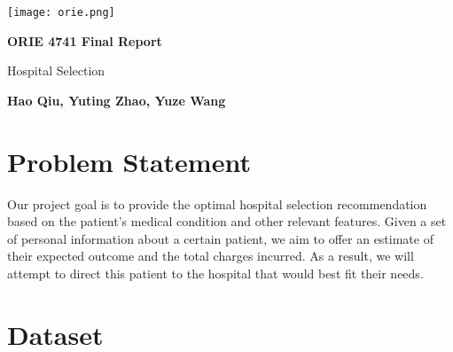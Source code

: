 \documentclass[12pt]{article}
\begin{document}
\begin{titlepage}
   \begin{center}
       
       \vspace*{1cm}
       \begin{center}
       \texttt{[image: orie.png]}
       \end{center}
       \vspace{8cm}
       
       \textbf{\Huge ORIE 4741 Final Report}
       
       \vspace{1cm}
        \larger Hospital Selection
 
       \vspace{3cm}
 
       \textbf{Hao Qiu, Yuting Zhao, Yuze Wang}
       
       \vspace{1cm}
       
 
       \vfill
       \vspace{0.8cm}
   \end{center}
\end{titlepage}

\tableofcontents
\pagebreak

\section{Problem Statement}
Our project goal is to provide the optimal hospital selection recommendation based on the patient’s medical condition and other relevant features. Given a set of personal information about a certain patient, we aim to offer an estimate of their expected outcome and the total charges incurred. As a result, we will attempt to direct this patient to the hospital that would best fit their needs.

\section{Dataset}
\end{document}
